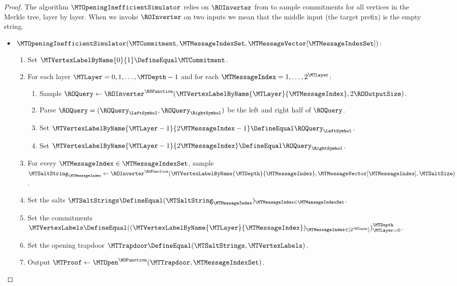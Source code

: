 \begin{proof}
The algorithm $\MTOpeningInefficientSimulator$ relies on $\ROInverter$ from  to sample commitments for all vertices in the Merkle tree, layer by layer. When we invoke $\ROInverter$ on two inputs we mean that the middle input (the target prefix) is the empty string.
\begin{itemize}[nosep]
\item[] $\MTOpeningInefficientSimulator(\MTCommitment,\MTMessageIndexSet,\MTMessageVector[\MTMessageIndexSet])$:
\begin{enumerate}[noitemsep]
\item Set $\MTVertexLabelByName{0}{1} \DefineEqual \MTCommitment$.
\item For each layer $\MTLayer = 0,1,\ldots,\MTDepth-1$ and for each $\MTMessageIndex = 1,\dots,2^{\MTLayer}$:
\begin{enumerate}[noitemsep]
\item Sample $\ROQuery \gets \ROInverter^{\ROFunction}(\MTVertexLabelByName{\MTLayer}{\MTMessageIndex},2\ROOutputSize)$.
\item Parse $\ROQuery = (\ROQuery_{\LeftSymbol},\ROQuery_{\RightSymbol})$ be the left and right half of $\ROQuery$.
\item Set $\MTVertexLabelByName{\MTLayer-1}{2\MTMessageIndex-1} \DefineEqual \ROQuery_{\LeftSymbol}$.
\item Set $\MTVertexLabelByName{\MTLayer-1}{2\MTMessageIndex} \DefineEqual \ROQuery_{\RightSymbol}$.
\end{enumerate}
\item For every $\MTMessageIndex \in \MTMessageIndexSet$, sample $\MTSaltString_{\MTMessageIndex} \gets \ROInverter^{\ROFunction}(\MTVertexLabelByName{\MTDepth}{\MTMessageIndex},\MTMessageVector[\MTMessageIndex],\MTSaltSize)$.
 \item Set the salts $\MTSaltStrings \DefineEqual (\MTSaltString_{\MTMessageIndex})_{\MTMessageIndex \in \MTMessageIndexSet}$.
 \item Set the commitments $\MTVertexLabels \DefineEqual ((\MTVertexLabelByName{\MTLayer}{\MTMessageIndex})_{\MTMessageIndex \in [2^{\MTLayer}]})_{\MTLayer=0}^{\MTDepth}$.
\item Set the opening trapdoor $\MTTrapdoor \DefineEqual (\MTSaltStrings,\MTVertexLabels)$.
\item Output $\MTProof \gets \MTOpen^{\ROFunction}(\MTTrapdoor, \MTMessageIndexSet)$.
\end{enumerate}
\end{itemize}

\end{proof}
